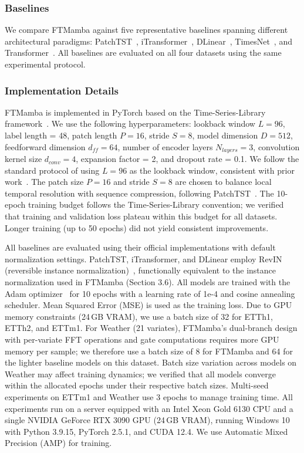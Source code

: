 \documentclass[electronics,article,submit,pdftex,moreauthors]{Definitions/mdpi}
\begin{document}
\subsubsection{Baselines}

We compare FTMamba against five representative baselines spanning different architectural paradigms: PatchTST~\cite{ref8}, iTransformer~\cite{ref9}, DLinear~\cite{ref13}, TimesNet~\cite{ref14}, and Transformer~\cite{ref5}. All baselines are evaluated on all four datasets using the same experimental protocol.

\subsubsection{Implementation Details}

FTMamba is implemented in PyTorch based on the Time-Series-Library framework~\cite{ref18}. We use the following hyperparameters: lookback window $L = 96$, label length = 48, patch length $P = 16$, stride $S = 8$, model dimension $D = 512$, feedforward dimension $d_{ff} = 64$, number of encoder layers $N_{layers} = 3$, convolution kernel size $d_{conv} = 4$, expansion factor = 2, and dropout rate = 0.1. We follow the standard protocol of using $L = 96$ as the lookback window, consistent with prior work~\cite{ref8,ref9}. The patch size $P = 16$ and stride $S = 8$ are chosen to balance local temporal resolution with sequence compression, following PatchTST~\cite{ref8}. The 10-epoch training budget follows the Time-Series-Library convention; we verified that training and validation loss plateau within this budget for all datasets. Longer training (up to 50 epochs) did not yield consistent improvements.

All baselines are evaluated using their official implementations with default normalization settings. PatchTST, iTransformer, and DLinear employ RevIN (reversible instance normalization)~\cite{ref8,ref9,ref13}, functionally equivalent to the instance normalization used in FTMamba (Section 3.6). All models are trained with the Adam optimizer~\cite{ref19} for 10 epochs with a learning rate of 1e-4 and cosine annealing scheduler. Mean Squared Error (MSE) is used as the training loss. Due to GPU memory constraints (24\,GB VRAM), we use a batch size of 32 for ETTh1, ETTh2, and ETTm1. For Weather (21 variates), FTMamba's dual-branch design with per-variate FFT operations and gate computations requires more GPU memory per sample; we therefore use a batch size of 8 for FTMamba and 64 for the lighter baseline models on this dataset. Batch size variation across models on Weather may affect training dynamics; we verified that all models converge within the allocated epochs under their respective batch sizes. Multi-seed experiments on ETTm1 and Weather use 3 epochs to manage training time. All experiments run on a server equipped with an Intel Xeon Gold 6130 CPU and a single NVIDIA GeForce RTX 3090 GPU (24\,GB VRAM), running Windows 10 with Python 3.9.15, PyTorch 2.5.1, and CUDA 12.4. We use Automatic Mixed Precision (AMP) for training.
\end{document}
